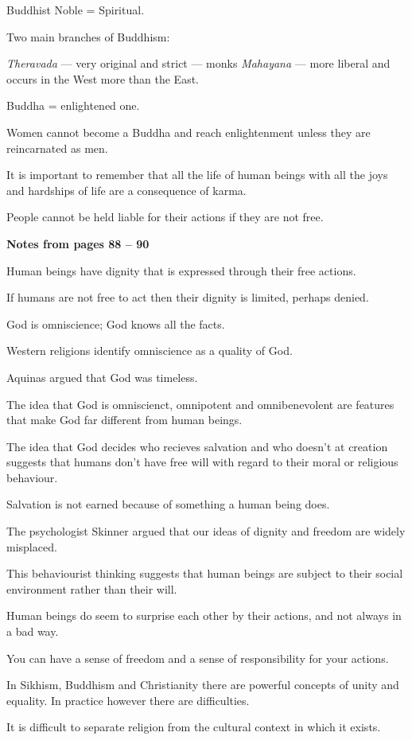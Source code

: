\documentclass{article}
\begin{document}
Buddhist Noble = Spiritual.

Two main branches of Buddhism:

\textsl{Theravada} --- very original and strict --- monks
\textsl{Mahayana} --- more liberal and occurs in the West more than the East.

Buddha = enlightened one.

Women cannot become a Buddha and reach enlightenment unless they are reincarnated as men.

It is important to remember that all the life of human beings with all the joys and hardships of life are a consequence of karma.

People cannot be held liable for their actions if they are not free.

\textbf{Notes from pages 88 -- 90}

Human beings have dignity that is expressed through their free actions.

If humans are not free to act then their dignity is limited, perhaps denied.

God is omniscience; God knows all the facts.

Western religions identify omniscience as a quality of God.

Aquinas argued that God was timeless.

The idea that God is omniscienct, omnipotent and omnibenevolent are features that make God far different from human beings.

The idea that God decides who recieves salvation and who doesn't at creation suggests that humans don't have free will with regard to their moral or religious behaviour.

Salvation is not earned because of something a human being does.

The psychologist Skinner argued that our ideas of dignity and freedom are widely misplaced.

This behaviourist thinking suggests that human beings are subject to their social environment rather than their will.

Human beings do seem to surprise each other by their actions, and not always in a bad way.

You can have a sense of freedom and a sense of responsibility for your actions.

In Sikhism, Buddhism and Christianity there are powerful concepts of unity and equality.  In practice however there are difficulties.

It is difficult to separate religion from the cultural context in which it exists.
\end{document}
